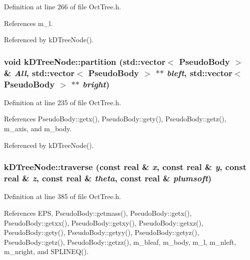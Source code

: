 Definition at line 266 of file OctTree.h.



References m\_\-l.



Referenced by kDTreeNode().

\subsubsection[{partition}]{\setlength{\rightskip}{0pt plus 5cm}void kDTreeNode::partition (std::vector$<$ {\bf PseudoBody} $>$ \& {\em All}, \/  std::vector$<$ {\bf PseudoBody} $>$ $\ast$$\ast$ {\em bleft}, \/  std::vector$<$ {\bf PseudoBody} $>$ $\ast$$\ast$ {\em bright})}\label{classkDTreeNode_a1080dd5e0ea2ec9adb350c42d1866105}


Definition at line 235 of file OctTree.h.



References PseudoBody::getx(), PseudoBody::gety(), PseudoBody::getz(), m\_\-axis, and m\_\-body.



Referenced by kDTreeNode().

\subsubsection[{traverse}]{ kDTreeNode::traverse (const {\bf real} \& {\em x}, \/  const {\bf real} \& {\em y}, \/  const {\bf real} \& {\em z}, \/  const {\bf real} \& {\em theta}, \/  const {\bf real} \& {\em plumsoft})}\label{classkDTreeNode_aac65d3b4c401b238b2c4dd9947264ccf}


Definition at line 385 of file OctTree.h.



References EPS, PseudoBody::getmass(), PseudoBody::getx(), PseudoBody::getxx(), PseudoBody::getxy(), PseudoBody::getxz(), PseudoBody::gety(), PseudoBody::getyy(), PseudoBody::getyz(), PseudoBody::getz(), PseudoBody::getzz(), m\_\-bleaf, m\_\-body, m\_\-l, m\_\-nleft, m\_\-nright, and SPLINEQ().



